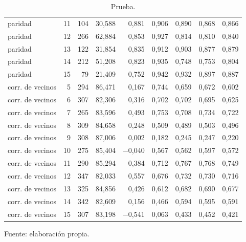 \begin{table}[htbp]
{\begin{tabular}{@{}lrrrrrrrr@{}}
        paridad & 11 & 104 & 30,588 & 0,881 & 0,906 & 0,890 & 0,868 & 0,866 \\
        paridad & 12 & 266 & 62,884 & 0,853 & 0,927 & 0,814 & 0,810 & 0,840 \\
        paridad & 13 & 122 & 31,854 & 0,835 & 0,912 & 0,903 & 0,877 & 0,879 \\
        paridad & 14 & 212 & 51,208 & 0,823 & 0,935 & 0,748 & 0,753 & 0,804 \\
        paridad & 15 & 79 & 21,409 & 0,752 & 0,942 & 0,932 & 0,897 & 0,887 \\
        corr. de vecinos & 5 & 294 & 86,471 & 0,167 & 0,744 & 0,659 & 0,672 & 0,602 \\
        corr. de vecinos & 6 & 307 & 82,306 & 0,316 & 0,702 & 0,702 & 0,695 & 0,625 \\
        corr. de vecinos & 7 & 265 & 83,596 & 0,493 & 0,753 & 0,708 & 0,734 & 0,722 \\
        corr. de vecinos & 8 & 309 & 84,658 & 0,248 & 0,509 & 0,489 & 0,503 & 0,496 \\
        corr. de vecinos & 9 & 308 & 87,006 & 0,002 & 0,182 & 0,245 & 0,247 & 0,220 \\
        corr. de vecinos & 10 & 275 & 85,404 & $-$0,040 & 0,567 & 0,562 & 0,597 & 0,572 \\
        corr. de vecinos & 11 & 290 & 85,294 & 0,384 & 0,712 & 0,767 & 0,768 & 0,749 \\
        corr. de vecinos & 12 & 347 & 82,033 & 0,557 & 0,676 & 0,732 & 0,730 & 0,716 \\
        corr. de vecinos & 13 & 325 & 84,856 & 0,426 & 0,612 & 0,682 & 0,690 & 0,677 \\
        corr. de vecinos & 14 & 342 & 82,609 & 0,156 & 0,466 & 0,594 & 0,595 & 0,591 \\
        corr. de vecinos & 15 & 307 & 83,198 & $-$0,541 & 0,063 & 0,433 & 0,452 & 0,421 \\
        \bottomrule
    \end{tabular}}

    \caption{Prueba.}
    \label{tab:e_tamano_r2_f}

    {\footnotesize Fuente: elaboración propia.}
\end{table}
